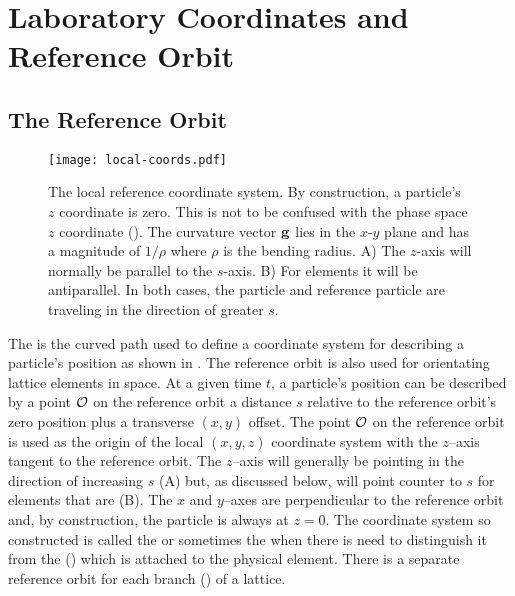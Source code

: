 \section{Laboratory Coordinates and Reference Orbit}
\label{s:local.coords}

\subsection{The Reference Orbit}
\label{s:ref}

\begin{figure}[tb]
  \centering
  \texttt{[image: local-coords.pdf]}
  \caption[The local Reference System.]
{The local reference coordinate system. By construction, a particle's $z$ coordinate is zero.  This
is not to be confused with the phase space $z$ coordinate (). The curvature
vector ${\bf g}$ lies in the $x$-$y$ plane and has a magnitude of $1/\rho$ where $\rho$ is the bending
radius. A) The $z$-axis will normally be parallel to the $s$-axis. B) For  elements it
will be antiparallel. In both cases, the particle and reference particle are traveling in the
direction of greater $s$.}
  \label{f:local.coords}
\end{figure}

The  is the curved path used to define a coordinate system for describing
a particle's position as shown in . The reference orbit is also used for
orientating lattice elements in space. At a given time $t$, a particle's position can be described
by a point ${\cal O}$ on the reference orbit a distance $s$ relative to the reference orbit's zero
position plus a transverse $(x,y)$ offset. The point ${\cal O}$ on the reference orbit is used as the
origin of the local $(x, y, z)$ coordinate system with the $z$--axis tangent to the reference
orbit. The $z$--axis will generally be pointing in the direction of increasing $s$
(A) but, as discussed below, will point counter to $s$ for elements that are
 (B). The $x$ and $y$--axes are perpendicular to the reference
orbit and, by construction, the particle is always at $z = 0$. The coordinate system so constructed
is called the  or sometimes the  when there is need to distinguish it from the 
() which is attached to the physical element. There is a separate reference orbit
for each branch () of a lattice.

